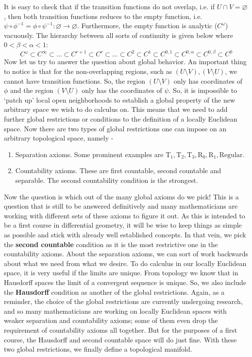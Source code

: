 \noindent It is easy to check that if the transition functions do not overlap, i.e. if $U\cap V=\varnothing$, then both transition functions reduces to the empty function, i.e. $\psi\circ\phi^{-1}=\phi\circ\psi^{-1}:\varnothing\to\varnothing$. Furthermore, the empty function is analytic ($C^\omega$) vacuously. The hierarchy between all sorts of continuity is given below where $0<\beta<\alpha<1$: $$\boxed{ C^\omega\subset C^\infty\subset\dots\subset C^{r+1}\subset C^r\subset\dots\subset C^2\subset C^1\subset C^{0,1}\subset C^{0,\alpha}\subset C^{0,\beta}\subset C^0}$$ Now let us try to answer the question about global behavior. An important thing to notice is that for the non-overlapping regions, such as $(U\setminus V),(V\setminus U)$, we cannot have transition functions. So, the region $(U\setminus V)$ only has coordinates of $\phi$ and the region $(V\setminus U)$ only has the coordinates of $\psi$. So, it is impossible to `patch up' local open neighborhoods to establish a global property of the new arbitrary space we wish to do calculus on. This means that we need to add further global restrictions or conditions to the definition of a locally Euclidean space. Now there are two types of global restrictions one can impose on an arbitrary topological space, namely -
\begin{enumerate}
	\item Separation axioms. Some prominent examples are $\mathrm{T}_1,\mathrm{T}_2,\mathrm{T}_3,\mathrm{R}_0,\mathrm{R}_1,\mathrm{Regular}$.
	\item Countability axioms. These are first countable, second countable and separable. The second countability condition is the strongest.
\end{enumerate}
Now the question is which out of the many global axioms do we pick! This is a question that is still to be answered definitively and many mathematicians are working with different sets of these axioms to figure it out. As this is intended to be a first course in differential geometry, it will be wise to keep things as simple as possible and stick with already well established concepts. In that vein, we pick the \textbf{second countable} condition as it is the most restrictive one in the countability axioms. About the separation axioms, we can sort of work backwards about what we need from what we desire. To do calculus in our locally Euclidean space, it is very useful if the limits are unique. From topology we know that in Hausdorff spaces the limit of a convergent sequence is unique. So, we also include the \textbf{Hausdorff} condition as another of the global restrictions. Again, as a reminder, the choice of the global restrictions are currently undergoing research, and so many mathematicians are working on locally Euclidean spaces with weaker separation and countability axioms; some of them even drop the requirement of countability axioms all together. But for the purposes of a first course, the Hausdorff and second countable space will do just fine. With these two global restrictions, we finally define a topological manifold.

